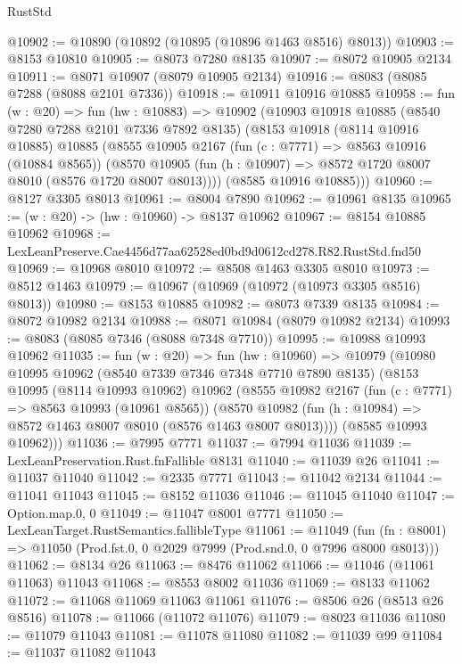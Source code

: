 \begin{lexlean}{RustStd}
\begin{coremodule}
@10902 := @10890 (@10892 (@10895 (@10896 @1463 @8516) @8013))
@10903 := @8153 @10810
@10905 := @8073 @7280 @8135
@10907 := @8072 @10905 @2134
@10911 := @8071 @10907 (@8079 @10905 @2134)
@10916 := @8083 (@8085 @7288 (@8088 @2101 @7336))
@10918 := @10911 @10916 @10885
@10958 := fun (w : @20) =>
  fun (hw : @10883) =>
  @10902
    (@10903
      @10918
      @10885
      (@8540 @7280 @7288 @2101 @7336 @7892 @8135)
      (@8153
        @10918
        (@8114 @10916 @10885)
        @10885
        (@8555
          @10905
          @2167
          (fun (c : @7771) => @8563 @10916 (@10884 @8565))
          (@8570 @10905 (fun (h : @10907) => @8572 @1720 @8007 @8010 (@8576 @1720 @8007 @8013))))
        (@8585 @10916 @10885)))
@10960 := @8127 @3305 @8013
@10961 := @8004 @7890
@10962 := @10961 @8135
@10965 := (w : @20) -> (hw : @10960) -> @8137 @10962
@10967 := @8154 @10885 @10962
@10968 := LexLeanPreserve.Cae4456d77aa62528ed0bd9d0612cd278.R82.RustStd.fnd50
@10969 := @10968 @8010
@10972 := @8508 @1463 @3305 @8010
@10973 := @8512 @1463
@10979 := @10967 (@10969 (@10972 (@10973 @3305 @8516) @8013))
@10980 := @8153 @10885
@10982 := @8073 @7339 @8135
@10984 := @8072 @10982 @2134
@10988 := @8071 @10984 (@8079 @10982 @2134)
@10993 := @8083 (@8085 @7346 (@8088 @7348 @7710))
@10995 := @10988 @10993 @10962
@11035 := fun (w : @20) =>
  fun (hw : @10960) =>
  @10979
    (@10980
      @10995
      @10962
      (@8540 @7339 @7346 @7348 @7710 @7890 @8135)
      (@8153
        @10995
        (@8114 @10993 @10962)
        @10962
        (@8555
          @10982
          @2167
          (fun (c : @7771) => @8563 @10993 (@10961 @8565))
          (@8570 @10982 (fun (h : @10984) => @8572 @1463 @8007 @8010 (@8576 @1463 @8007 @8013))))
        (@8585 @10993 @10962)))
@11036 := @7995 @7771
@11037 := @7994 @11036
@11039 := LexLeanPreservation.Rust.fnFallible @8131
@11040 := @11039 @26
@11041 := @11037 @11040
@11042 := @2335 @7771
@11043 := @11042 @2134
@11044 := @11041 @11043
@11045 := @8152 @11036
@11046 := @11045 @11040
@11047 := Option.map.{0, 0}
@11049 := @11047 @8001 @7771
@11050 := LexLeanTarget.RustSemantics.fallibleType
@11061 := @11049
    (fun (fn : @8001) => @11050 (Prod.fst.{0, 0} @2029 @7999 (Prod.snd.{0, 0} @7996 @8000 @8013)))
@11062 := @8134 @26
@11063 := @8476 @11062
@11066 := @11046 (@11061 @11063) @11043
@11068 := @8553 @8002 @11036
@11069 := @8133 @11062
@11072 := @11068 @11069 @11063 @11061
@11076 := @8506 @26 (@8513 @26 @8516)
@11078 := @11066 (@11072 @11076)
@11079 := @8023 @11036
@11080 := @11079 @11043
@11081 := @11078 @11080
@11082 := @11039 @99
@11084 := @11037 @11082 @11043

\end{coremodule}
\end{lexlean}
